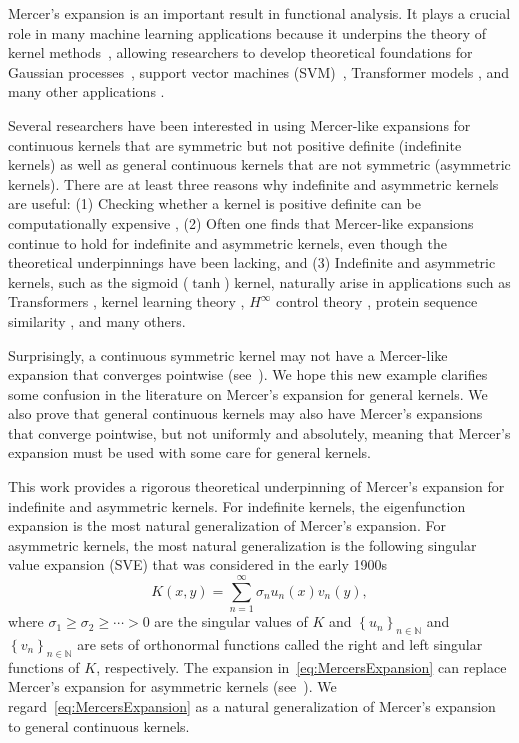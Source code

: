 \documentclass{article}
\begin{document}
Mercer's expansion is an important result in functional analysis. It plays a crucial role in many machine learning applications because it underpins the theory of kernel methods~\citep{scholkopf2018learning,kung2014kernel}, allowing researchers to develop theoretical foundations for Gaussian processes~\citep{kanagawa2018gaussian}, support vector machines (SVM)~\citep{cortes1995support,steinwart2008support}, Transformer models \citep{vaswani2017,wright2021transformers}, and many other applications \citep{ghojogh2021reproducing}.

Several researchers have been interested in using Mercer-like expansions for continuous kernels that are symmetric but not positive definite (indefinite kernels) as well as general continuous kernels that are not symmetric (asymmetric kernels). There are at least three reasons why indefinite and asymmetric kernels are useful: (1) Checking whether a kernel is positive definite can be computationally expensive \citep{luss2007support,huang2017indefinite}, (2) Often one finds that Mercer-like expansions continue to hold for indefinite and asymmetric kernels, even though the theoretical underpinnings have been lacking, and (3) Indefinite and asymmetric kernels, such as the sigmoid ($\tanh$) kernel, naturally arise in applications such as Transformers \citep{wright2021transformers,chen2024primal}, kernel learning theory \citep{haasdonk2002tangent,ong2004learning,he2023learning}, $H^\infty$ control theory \citep{hassibi1999indefinite}, protein sequence similarity \citep{saigo2004protein,vert2004local}, and many others. 


Surprisingly, a continuous symmetric kernel may not have a Mercer-like expansion that converges pointwise (see~). We hope this new example clarifies some confusion in the literature on Mercer's expansion for general kernels. We also prove that general continuous kernels may also have Mercer's expansions that converge pointwise, but not uniformly and absolutely, meaning that Mercer's expansion must be used with some care for general kernels. 

This work provides a rigorous theoretical underpinning of Mercer's expansion for indefinite and asymmetric kernels. For indefinite kernels, the eigenfunction expansion is the most natural generalization of Mercer's expansion. For asymmetric kernels, the most natural generalization is the following singular value expansion (SVE) that was considered in the early 1900s~\citep{schmidt1907theorie}
\begin{equation}
    K(x, y) = \sum_{n=1}^\infty \sigma_n u_n(x) v_n(y),
    \label{eq:MercersExpansion}
\end{equation}
where $\sigma_1\geq \sigma_2\geq \cdots > 0$ are the singular values of $K$ and $\left\{u_n\right\}_{n\in\mathbb{N}}$ and $\left\{v_n\right\}_{n\in\mathbb{N}}$ are sets of orthonormal functions called the right and left singular functions of $K$, respectively. The expansion in~\cref{eq:MercersExpansion} can replace Mercer's expansion for asymmetric kernels (see~). We regard~\cref{eq:MercersExpansion} as a natural generalization of Mercer's expansion to general continuous kernels. 
\end{document}
